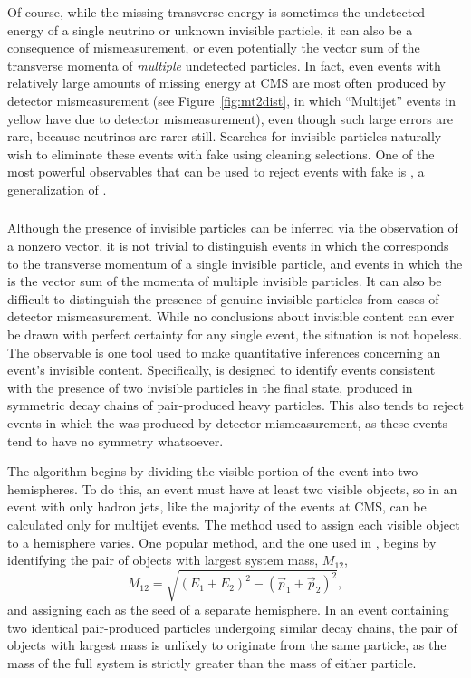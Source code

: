  Of course, while the missing transverse energy is sometimes the undetected energy of a single neutrino or unknown invisible particle, it can also be a consequence of mismeasurement, or even potentially the vector sum of the transverse momenta of {\it multiple} undetected particles.
  In fact, even events with relatively large amounts of missing energy at CMS are most often produced by detector mismeasurement (see Figure~\ref{fig:mt2dist}, in which ``Multijet'' events in yellow have \met due to detector mismeasurement), even though such large errors are rare, because neutrinos are rarer still.
  Searches for invisible particles naturally wish to eliminate these events with fake \met using cleaning selections.
  One of the most powerful observables that can be used to reject events with fake \met is \mttwo \cite{mt2}, a generalization of \Mt.

    \subsubsection{\mttwo} \label{sec:MT2}

    Although the presence of invisible particles can be inferred via the observation of a nonzero \met vector, it is not trivial to distinguish events in which the \met corresponds to the transverse momentum of a single invisible particle, and events in which the \met is the vector sum of the momenta of multiple invisible particles.
    It can also be difficult to distinguish the presence of genuine invisible particles from cases of detector mismeasurement.
    While no conclusions about invisible content can ever be drawn with perfect certainty for any single event, the situation is not hopeless.
    The \mttwo observable is one tool used to make quantitative inferences concerning an event's invisible content.
    Specifically, \mttwo is designed to identify events consistent with the presence of two invisible particles in the final state, produced in symmetric decay chains of pair-produced heavy particles.
    This also tends to reject events in which the \met was produced by detector mismeasurement, as these events tend to have no symmetry whatsoever.

    The algorithm begins by dividing the visible portion of the event into two hemispheres.
    To do this, an event must have at least two visible objects, so in an event with only hadron jets, like the majority of the events at CMS, \mttwo can be calculated only for multijet events.
    The method used to assign each visible object to a hemisphere varies.
    One popular method, and the one used in \cite{MT2_2019}, begins by identifying the pair of objects with largest system mass, $M_{12}$,
    \begin{equation} \label{eqn:dijetmass}
      M_{12} = \sqrt{(E_1+E_2)^2-(\vec{p}_1+\vec{p}_2)^2},
    \end{equation}
    and assigning each as the seed of a separate hemisphere.
    In an event containing two identical pair-produced particles undergoing similar decay chains, the pair of objects with largest mass is unlikely to originate from the same particle, as the mass of the full system is strictly greater than the mass of either particle.

